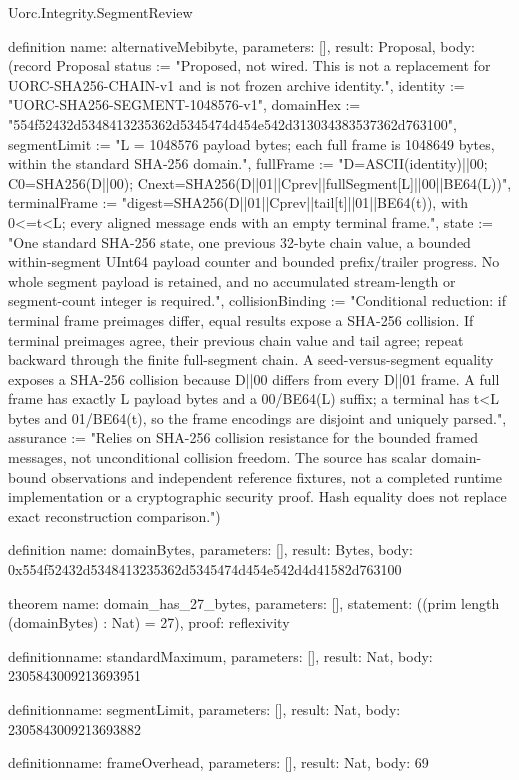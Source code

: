 \begin{lexlean}{Uorc.Integrity.SegmentReview}
\begin{semanticmodule}
definition{
  name: alternativeMebibyte,
  parameters: [],
  result: Proposal,
  body: (record Proposal {status := "Proposed, not wired. This is not a replacement for UORC-SHA256-CHAIN-v1 and is not frozen archive identity.", identity := "UORC-SHA256-SEGMENT-1048576-v1", domainHex := "554f52432d5348413235362d5345474d454e542d313034383537362d763100", segmentLimit := "L = 1048576 payload bytes; each full frame is 1048649 bytes, within the standard SHA-256 domain.", fullFrame := "D=ASCII(identity)||00; C0=SHA256(D||00); Cnext=SHA256(D||01||Cprev||fullSegment[L]||00||BE64(L))", terminalFrame := "digest=SHA256(D||01||Cprev||tail[t]||01||BE64(t)), with 0<=t<L; every aligned message ends with an empty terminal frame.", state := "One standard SHA-256 state, one previous 32-byte chain value, a bounded within-segment UInt64 payload counter and bounded prefix/trailer progress. No whole segment payload is retained, and no accumulated stream-length or segment-count integer is required.", collisionBinding := "Conditional reduction: if terminal frame preimages differ, equal results expose a SHA-256 collision. If terminal preimages agree, their previous chain value and tail agree; repeat backward through the finite full-segment chain. A seed-versus-segment equality exposes a SHA-256 collision because D||00 differs from every D||01 frame. A full frame has exactly L payload bytes and a 00/BE64(L) suffix; a terminal has t<L bytes and 01/BE64(t), so the frame encodings are disjoint and uniquely parsed.", assurance := "Relies on SHA-256 collision resistance for the bounded framed messages, not unconditional collision freedom. The source has scalar domain-bound observations and independent reference fixtures, not a completed runtime implementation or a cryptographic security proof. Hash equality does not replace exact reconstruction comparison."})
}

definition{
  name: domainBytes,
  parameters: [],
  result: Bytes,
  body: 0x554f52432d5348413235362d5345474d454e542d4d41582d763100
}

theorem{
  name: domain_has_27_bytes,
  parameters: [],
  statement: ((prim length (domainBytes) : Nat) = 27),
  proof: reflexivity{}
}

definition{name: standardMaximum, parameters: [], result: Nat, body: 2305843009213693951}

definition{name: segmentLimit, parameters: [], result: Nat, body: 2305843009213693882}

definition{name: frameOverhead, parameters: [], result: Nat, body: 69}


\end{semanticmodule}
\end{lexlean}
